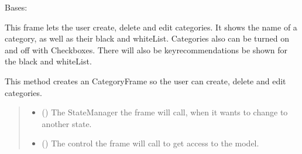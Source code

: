 \documentclass[letterpaper,10pt,english]{sphinxmanual}
\begin{document}
\begin{fulllineitems}
\label{\detokenize{apidoc/src.osm_configurator.view.toplevelframes:src.osm_configurator.view.toplevelframes.category_frame.CategoryFrame}}
\pysigstartsignatures
{}
\pysigstopsignatures
\sphinxAtStartPar
Bases: {\hyperref[\detokenize{apidoc/src.osm_configurator.view.toplevelframes:src.osm_configurator.view.toplevelframes.top_level_frame.TopLevelFrame}]{}}

\sphinxAtStartPar
This frame lets the user create, delete and edit categories.
It shows the name of a category, as well as their black\sphinxhyphen{} and white\sphinxhyphen{}List.
Categories also can be turned on and off with Checkboxes.
There will also be key\sphinxhyphen{}recommendations be shown for the black\sphinxhyphen{} and white\sphinxhyphen{}List.

\begin{fulllineitems}
\label{\detokenize{apidoc/src.osm_configurator.view.toplevelframes:src.osm_configurator.view.toplevelframes.category_frame.CategoryFrame.__init__}}
\pysigstartsignatures
{}
\pysigstopsignatures
\sphinxAtStartPar
This method creates an CategoryFrame so the user can create, delete and edit categories.
\begin{quote}\begin{description}
\begin{itemize}
\item {} 
\sphinxAtStartPar
{} ({\hyperref[\detokenize{apidoc/src.osm_configurator.view.states:src.osm_configurator.view.states.state_manager.StateManager}]{}}) \textendash{} The StateManager the frame will call, when it wants to change to another state.

\item {} 
\sphinxAtStartPar
{} ({\hyperref[\detokenize{apidoc/src.osm_configurator.control:src.osm_configurator.control.control_interface.IControl}]{}}) \textendash{} The control the frame will call to get access to the model.


\end{itemize}
\end{description}
\end{quote}
\end{fulllineitems}
\end{fulllineitems}
\end{document}

